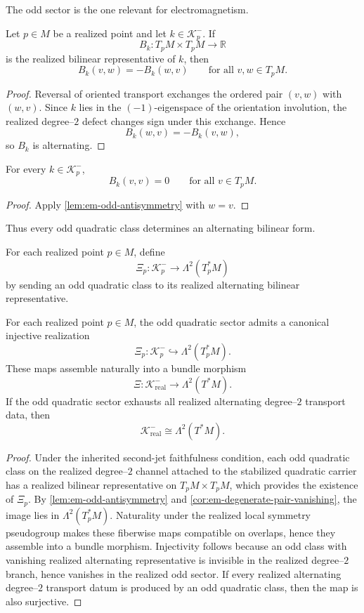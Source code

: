 The odd sector is the one relevant for electromagnetism.
\begin{lemma}
	\label{lem:em-odd-antisymmetry}
	Let \(p\in M\) be a realized point and let \(k\in\mathcal K^-_p\).
	If
	\[
		B_k:T_pM\times T_pM\to\mathbb R
	\]
	is the realized bilinear representative of \(k\), then
	\[
		B_k(v,w)=-B_k(w,v)
		\qquad
		\text{for all }v,w\in T_pM.
	\]
\end{lemma}
\begin{proof}
	Reversal of oriented transport exchanges the ordered pair
	\((v,w)\) with \((w,v)\).
	Since \(k\) lies in the \((-1)\)-eigenspace of the orientation
	involution, the realized degree--\(2\) defect changes sign under this
	exchange.
	Hence
	\[
		B_k(w,v)=-B_k(v,w),
	\]
	so \(B_k\) is alternating.
\end{proof}
\begin{corollary}
	\label{cor:em-degenerate-pair-vanishing}
	For every \(k\in\mathcal K^-_p\),
	\[
		B_k(v,v)=0
		\qquad
		\text{for all }v\in T_pM.
	\]
\end{corollary}
\begin{proof}
	Apply \cref{lem:em-odd-antisymmetry} with \(w=v\).
\end{proof}
Thus every odd quadratic class determines an alternating bilinear form.
\begin{definition}
	For each realized point \(p\in M\), define
	\[
		\Xi_p:\mathcal K^-_p\longrightarrow \Lambda^2(T_p^*M)
	\]
	by sending an odd quadratic class to its realized alternating bilinear
	representative.
\end{definition}
\begin{theorem}
	\label{thm:em-odd-twoform}
	For each realized point \(p\in M\), the odd quadratic sector admits a
	canonical injective realization
	\[
		\Xi_p:\mathcal K^-_p\hookrightarrow \Lambda^2(T_p^*M).
	\]
	These maps assemble naturally into a bundle morphism
	\[
		\Xi:\mathcal K^-_{\mathrm{real}}\to \Lambda^2(T^*M).
	\]
	If the odd quadratic sector exhausts all realized alternating degree--\(2\)
	transport data, then
	\[
		\mathcal K^-_{\mathrm{real}}\cong \Lambda^2(T^*M).
	\]
\end{theorem}
\begin{proof}
	Under the inherited second-jet faithfulness condition, each odd
	quadratic class on the realized degree--\(2\) channel attached to the
	stabilized quadratic carrier has a realized bilinear representative on
	\(T_pM\times T_pM\), which provides the existence of \(\Xi_p\).
	By \cref{lem:em-odd-antisymmetry} and
	\cref{cor:em-degenerate-pair-vanishing}, the image lies in
	\(\Lambda^2(T_p^*M)\).
	Naturality under the realized local symmetry pseudogroup makes these
	fiberwise maps compatible on overlaps, hence they assemble into a
	bundle morphism.
	Injectivity follows because an odd class with vanishing realized
	alternating representative is invisible in the realized degree--\(2\)
	branch, hence vanishes in the realized odd sector.
	If every realized alternating degree--\(2\) transport datum is produced
	by an odd quadratic class, then the map is also surjective.
\end{proof}
